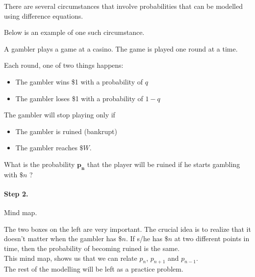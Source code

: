 \hfill


There are several circumstances that involve probabilities that can be modelled using difference equations.

Below is an example of one such circumstance.


\begin{example}

A gambler plays a game at a casino. The game is played one round at a time. 
\vfill

Each round, one of two things happens:
\begin{itemize}
\item The gambler wins \$1 with a probability of $q$
\item The gambler loses \$1 with a probability of $1-q$\\
\end{itemize}

The gambler will stop playing only if
\begin{itemize}
\item The gambler is ruined (bankrupt)
\item The gambler reaches $\$W$.\\
\end{itemize}

What is the probability $\pmb{p_n}$ that the player will be ruined if he starts gambling with $\$n$  ?	 \\


\paragraph{Step 2.} Mind map.
\begin{center}
\end{center}


The two boxes on the left are very important. The crucial idea is to realize that it doesn't matter when the gambler has $\$n$. If s/he has $\$n$ at two different points in time, then the probability of becoming ruined is the same. \\

This mind map, shows us that we can relate $p_n$, $p_{n+1}$ and $p_{n-1}$.\\

The rest of the modelling will be left as a practice problem.

\end{example}


